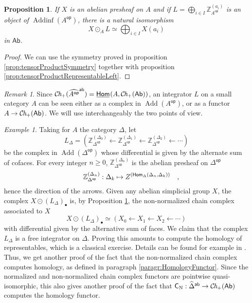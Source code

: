 \documentclass[10pt, english, a4paper, nothms]{amsart}
\theoremstyle{plain}
\newtheorem{prop}[theorem]{Proposition}
\theoremstyle{remark}
\newtheorem{remark}[theorem]{Remark}
\newtheorem{example}[theorem]{Example}
\theoremstyle{definition}
\numberwithin{equation}{theorem}
\renewcommand\geq\geqslant
\newcommand\Z{\mathbb{Z}}
\newcommand{\Ch}{{\mathcal{C}\mspace{-2.mu}\it{h}_{+}}}
\newcommand{\Hom}{\operatorname{\mathsf{Hom}}}
\newcommand{\Homi}{\operatorname{\kern.5truept\underline{\kern-.5truept\mathsf{Hom}\kern-.5truept}\kern1truept}}
\DeclareMathOperator{\op}{\mathsf{op}}
\newcommand{\Ab}{{\mathsf{Ab}}}
\DeclareMathOperator{\Add}{\mathrm{Add}}
\newcommand{\Addinf}{\operatorname{\mathrm{Addinf}}}
\newcommand{\Wh}[2]{\Z_{#1}^{\left(#2\right)}}
\newcommand{\prefab}[1]{\widehat{ #1 }^{\mathsf{ab}}}
\DeclareMathOperator{\dk}{\mathsf{C}_N}
\newcommand\zbox[1]{\makebox[0pt][l]{#1}}
\newcommand\pbox[1]{\zbox{\quad #1}} %
\begin{document}
\begin{prop}\label{prop:tensorProductAddRight}
If $X$ is an abelian presheaf on $A$ and if $L = \bigoplus_{i\in I}
\Wh{{A}^{\op}}{a_i}$ is an object of $\Addinf({A}^{\op})$, there is a natural
isomorphism 
\[
X \odot_A L \simeq \bigoplus_{i\in I} X(a_i)
\]
in $\Ab$.
\end{prop}
\begin{proof}
We can use the symmetry proved in proposition \ref{prop:tensorProductSymmetry}
together with proposition \ref{prop:tensorProductRepresentableLeft}.
\end{proof}


\begin{remark}
Since $\Ch(\prefab{{A}^{\op}}) = \Homi(A,\Ch(\Ab))$, an integrator $L$ on a
small category $A$ can be seen either as a complex in $\Add({A}^{\op})$, or as a
functor $A \to \Ch(\Ab)$. We will use interchangeably the two points of view.
\end{remark}

\begin{example}\label{ex:IntegratorDelta}
Taking for $A$ the category $\Delta$, let
\[
L_\Delta = 
\left(
\Wh{\Delta^{\op}}{\Delta_0} 
\leftarrow \Wh{\Delta^{\op}}{\Delta_1} 
\leftarrow \Wh{\Delta^{\op}}{\Delta_2} 
\leftarrow \cdots
\right)
\]
be the complex in $\Add({\Delta}^{\op})$ whose differential is given by the
alternate sum of cofaces. 
For every integer $n\geq 0$, $\Wh{\Delta^{\op}}{\Delta_n}$ is the
abelian presheaf on ${\Delta}^{\op}$
\[
  \Wh{{\Delta}^{\op}}{\Delta_n}: \Delta_k
  \mapsto \\Z^{(\Hom_\Delta(\Delta_n,\Delta_k))} \pbox{,}
  \]
hence the direction of the arrows. 
Given any abelian simplicial group $X$, the complex $X \odot (L_\Delta)_\bullet$
is, by Proposition \ref{prop:tensorProductAddRight}, the non-normalized chain complex associated to $X$
\[
X \odot (L_\Delta)_\bullet \simeq
\left(
X_0 \leftarrow X_1 \leftarrow X_2 \leftarrow \cdots 
\right)
\]
with differential given by the alternative sum of faces.
We claim that the complex $L_\Delta$ is a free integrator on $\Delta$.
Proving this amounts to compute the homology of representables, which
is a classical exercise. Details can be found for example in
\cite[Example~2.5.7]{hubert2025phd}. Thus, we get another proof of the
fact that the non-normalized chain complex computes homology, as defined
in paragraph \ref{paragr:HomologyFunctor}. Since the normalized and
non-normalized chain complex functors are pointwise quasi-isomorphic, this also
gives another proof of the fact that $\dk : \prefab{\Delta}\to\Ch(\Ab)$ computes
the homology functor.
\end{example}
\end{document}
